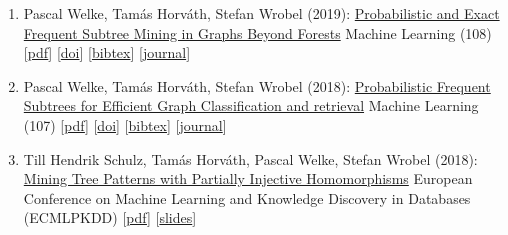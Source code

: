 \documentclass{scrartcl}
\begin{document}
\begin{enumerate}
{(Dis-)similarities of Knowledge Networks across Languages}\newline
Frontiers in Education | Digital Education\newline
{\footnotesize
[\href{https://pwelke.github.io/publications/mehler2020frontiers.pdf}{pdf}]
[\href{https://dx.doi.org/http://dx.doi.org/10.3389/feduc.2020.562670}{doi}]
[\href{https://arxiv.org/abs/2008.02047}{arxiv}]
[\href{https://dblp.org/rec/journals/corr/abs-2008-02047.bib}{bibtex}]
[\href{https://www.frontiersin.org/journals/education/sections/digital-education#}{journal}]
}
\item
\label{welke2019mach}
Pascal Welke, Tamás Horváth, Stefan Wrobel (2019):\newline
\href{https://dx.doi.org/10.1007/s10994-019-05779-1}{Probabilistic and Exact Frequent Subtree Mining in Graphs Beyond Forests}\newline
Machine Learning (108)\newline
{\footnotesize
[\href{https://pwelke.github.io/publications/welke2019mach.pdf}{pdf}]
[\href{https://dx.doi.org/10.1007/s10994-019-05779-1}{doi}]
[\href{https://dblp.org/rec/journals/ml/WelkeHW19.bib}{bibtex}]
[\href{https://link.springer.com/journal/10994}{journal}]
}
\item
\label{welke2018mach}
Pascal Welke, Tamás Horváth, Stefan Wrobel (2018):\newline
\href{https://dx.doi.org/10.1007/s10994-017-5688-7}{Probabilistic Frequent Subtrees for Efficient Graph Classification
and retrieval}\newline
Machine Learning (107)\newline
{\footnotesize
[\href{https://pwelke.github.io/publications/welke2018mach.pdf}{pdf}]
[\href{https://dx.doi.org/10.1007/s10994-017-5688-7}{doi}]
[\href{https://dblp.org/rec/journals/ml/WelkeHW18.bib}{bibtex}]
[\href{https://link.springer.com/journal/10994}{journal}]
}
\item
\label{schulz2018ecml}
Till Hendrik Schulz, Tamás Horváth, Pascal Welke, Stefan Wrobel (2018):\newline
\href{https://dx.doi.org/10.1007/978-3-030-10928-8_35}{Mining Tree Patterns with Partially Injective Homomorphisms}\newline
European Conference on Machine Learning and Knowledge Discovery in Databases (ECMLPKDD)\newline
{\footnotesize
[\href{https://pwelke.github.io/publications/schulz2018ecml.pdf}{pdf}]
[\href{https://pwelke.github.io/publications/schulz2018ecml-slides.pdf}{slides}]
}
\end{enumerate}
\end{document}
